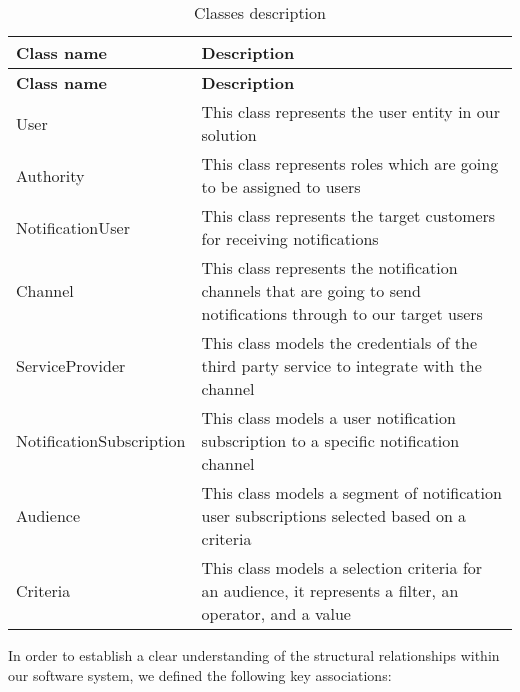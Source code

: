 \begin{longtable}{ | m{} | m{} | }
    \caption{Classes description} \label{class-desc}                                                                                            \\
    \hline
    \textbf{Class name}      & \textbf{Description}                                                                                             \\
    \hline
    \endfirsthead
    \hline
    \textbf{Class name}      & \textbf{Description}                                                                                             \\
    \hline
    \endhead
    \endfoot
    \hline
    \endlastfoot
    User                     & This class represents the user entity in our solution                                                            \\
    \hline
    Authority                & This class represents roles which are going to be assigned to users                                              \\
    \hline
    NotificationUser         & This class represents the target customers for receiving notifications                                           \\
    \hline
    Channel                  & This class represents the notification channels that are going to send notifications through to our target users \\
    \hline
    ServiceProvider          & This class models the credentials of the third party service to integrate with the channel                       \\
    \hline
    NotificationSubscription & This class models a user notification subscription to a specific notification channel                            \\
    \hline
    Audience                 & This class models a segment of notification user subscriptions selected based on a criteria                      \\
    \hline
    Criteria                 & This class models a selection criteria for an audience, it represents a filter, an operator, and a value         \\
\end{longtable}

\noindent In order to establish a clear understanding of the structural relationships within our software system,
we defined the following key associations:

